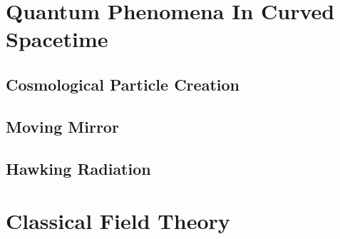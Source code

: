 \documentclass[12pt]{article}
\numberwithin{equation}{subsection}
\theoremstyle{mystyle}{\newtheorem{definition}{Definition}[subsection]}
\theoremstyle{mystyle}{\newtheorem{theorem}[definition]{Theorem}}
\theoremstyle{mystyle}{\newtheorem*{remark}{Remark}}
\theoremstyle{mystyle}{\newtheorem{example}{Example}[subsection]}
\theoremstyle{mystyle}{\newtheorem{examples}{Examples}[subsection]}
\theoremstyle{mystyle}{\newtheorem{cthm}{}[subsection]}
\begin{document}
\section{Quantum Phenomena In Curved Spacetime}


\subsection{Cosmological Particle Creation}



\subsection{Moving Mirror}


\subsection{Hawking Radiation}


\newpage
\appendix
{}





\section{Classical Field Theory}


\newpage
\newpage
\end{document}
